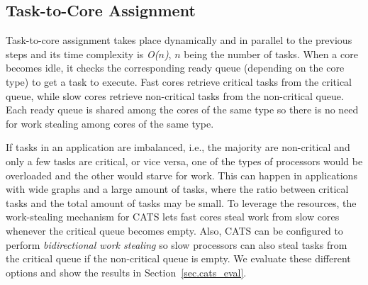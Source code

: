\subsection{Task-to-Core Assignment}
\label{sec.cats.assignment}
Task-to-core assignment takes place dynamically and in parallel to the previous steps and its time complexity is \textit{O($n$)}, \textit{$n$} being the number of tasks. When a core becomes idle, it checks the corresponding ready queue (depending on the core type) to get a task to execute. Fast cores retrieve critical tasks from the critical queue, while slow cores retrieve non-critical tasks from the non-critical queue. Each ready queue is shared among the cores of the same type so there is no need for work stealing among cores of the same type. 

If tasks in an application are imbalanced, i.e., the majority are non-critical and only a few tasks are critical, or vice versa, one of the types of processors would be overloaded and the other would starve for work. This can happen in applications with wide graphs and a large amount of tasks, where the ratio between critical tasks and the total amount of tasks may be small. To leverage the resources, the work-stealing mechanism for CATS lets fast cores steal work from slow cores whenever the critical queue becomes empty. 
Also, CATS can be configured to perform \textit{bidirectional work stealing} so slow processors can also steal tasks from the critical queue if the non-critical queue is empty. 
We evaluate these different options and show the results in Section~\ref{sec.cats_eval}.
